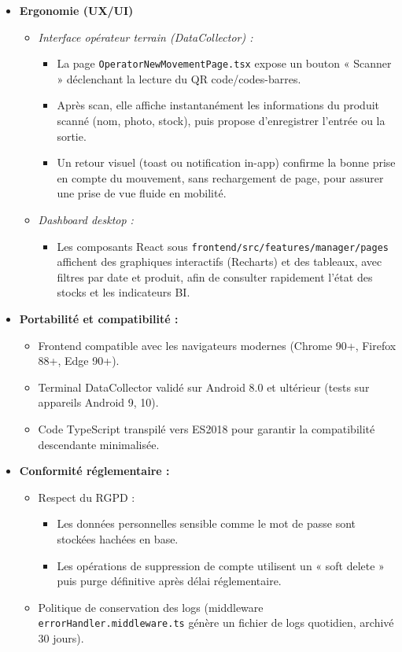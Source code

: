 \documentclass[12pt,a4paper]{report}
\begin{document}
\begin{itemize}
  
\item \textbf{Ergonomie (UX/UI)}
\begin{itemize}
  \item \emph{Interface opérateur terrain (DataCollector) :}  
    \begin{itemize}
      \item La page \texttt{OperatorNewMovementPage.tsx} expose un bouton « Scanner » déclenchant la lecture du QR code/codes-barres.  
      \item Après scan, elle affiche instantanément les informations du produit scanné (nom, photo, stock), puis propose d’enregistrer l’entrée ou la sortie.  
      \item Un retour visuel (toast ou notification in-app) confirme la bonne prise en compte du mouvement, sans rechargement de page, pour assurer une prise de vue fluide en mobilité.
    \end{itemize}
  \item \emph{Dashboard desktop :}  
    \begin{itemize}
      \item Les composants React sous \texttt{frontend/src/features/manager/pages} affichent des graphiques interactifs (Recharts) et des tableaux, avec filtres par date et produit, afin de consulter rapidement l’état des stocks et les indicateurs BI.
    \end{itemize}
\end{itemize}

  \item \textbf{Portabilité et compatibilité :}  
    \begin{itemize}
      \item Frontend compatible avec les navigateurs modernes (Chrome 90+, Firefox 88+, Edge 90+).  
      \item Terminal DataCollector validé sur Android 8.0 et ultérieur (tests sur appareils Android 9, 10).  
      \item Code TypeScript transpilé vers ES2018 pour garantir la compatibilité descendante minimalisée.
    \end{itemize}

  \item \textbf{Conformité réglementaire :}  
    \begin{itemize}
      \item Respect du RGPD :  
        \begin{itemize}
          \item Les données personnelles sensible comme le mot de passe sont stockées hachées en base.  
          \item Les opérations de suppression de compte utilisent un « soft delete » puis purge définitive après délai réglementaire.  
        \end{itemize}
      \item Politique de conservation des logs (middleware \texttt{errorHandler.middleware.ts} génère un fichier de logs quotidien, archivé 30 jours).
    \end{itemize}
\end{itemize}
\cleardoublepage
\end{document}
